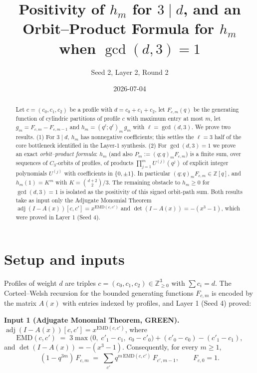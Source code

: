 \documentclass[11pt]{article}
\title{Positivity of $h_m$ for $3\mid d$, and an Orbit--Product Formula for $h_m$ when $\gcd(d,3)=1$}
\author{Seed 2, Layer 2, Round 2}
\date{2026-07-04}
\newcommand{\EMD}{\mathrm{EMD}}
\begin{document}
\maketitle

\begin{abstract}
Let $c=(c_0,c_1,c_2)$ be a profile with $d=c_0+c_1+c_2$, let $F_{c,m}(q)$ be the generating
function of cylindric partitions of profile $c$ with maximum entry at most $m$, let
$g_m = F_{c,m}-F_{c,m-1}$ and $h_m = (q^\ell;q^\ell)_m\, g_m$ with $\ell=\gcd(d,3)$.
We prove two results. (1) For $3\mid d$, $h_m$ has nonnegative coefficients; this settles the
$\ell=3$ half of the core bottleneck identified in the Layer-1 synthesis. (2) For
$\gcd(d,3)=1$ we prove an exact \emph{orbit--product formula}: $h_m$ (and also
$P_m := (q;q)_m F_{c,m}$) is a finite sum, over sequences of $C_3$-orbits of profiles, of
products $\prod_{j=1}^m U^{(j)}(q^j)$ of explicit integer polynomials $U^{(j)}$ with
coefficients in $\{0,\pm 1\}$. In particular $(q;q)_m F_{c,m} \in \mathbb{Z}[q]$, and
$h_m(1)=K^m$ with $K = \binom{d+2}{2}/3$. The remaining obstacle to $h_m\ge 0$ for
$\gcd(d,3)=1$ is isolated as the positivity of this signed orbit-path sum.
Both results take as input only the Adjugate Monomial Theorem
$\operatorname{adj}(I-A(x))[c,c'] = x^{\EMD(c,c')}$ and $\det(I-A(x)) = -(x^3-1)$,
which were proved in Layer 1 (Seed 4).
\end{abstract}

\section{Setup and inputs}

Profiles of weight $d$ are triples $c=(c_0,c_1,c_2)\in\mathbb{Z}_{\ge0}^3$ with $\sum c_i = d$.
The Corteel--Welsh recursion for the bounded generating functions $F_{c,m}$ is encoded by the
matrix $A(x)$ with entries indexed by profiles, and Layer 1 (Seed 4) proved:

\medskip
\noindent\textbf{Input 1 (Adjugate Monomial Theorem, GREEN).}
$\operatorname{adj}(I-A(x))[c,c'] = x^{\EMD(c,c')}$, where
\begin{equation}\label{eq:emd}
\EMD(c,c') \;=\; 3\max\bigl(0,\; c'_1-c_1,\; c_0-c'_0\bigr) + (c'_0-c_0) - (c'_1-c_1),
\end{equation}
and $\det(I-A(x)) = -(x^3-1)$. Consequently, for every $m\ge 1$,
\begin{equation}\label{eq:inversion}
(1-q^{3m})\, F_{c,m} \;=\; \sum_{c'} q^{m\,\EMD(c,c')}\, F_{c',m-1},
\qquad F_{c,0}=1 .
\end{equation}
\end{document}
